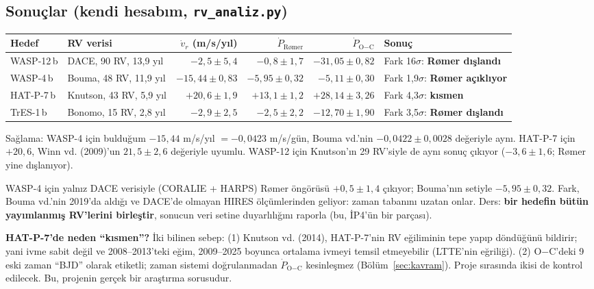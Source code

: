 \subsection{Sonuçlar (kendi hesabım, \texttt{rv\_analiz.py})}
\begin{center}
\small
\begin{tabularx}{\textwidth}{l >{\raggedright\arraybackslash}X r r r >{\raggedright\arraybackslash}X}
\toprule
Hedef & RV verisi & $\dot v_r$ (m/s/yıl) & $\dot P_\text{Rømer}$ & $\dot P_\text{O$-$C}$ & Sonuç\\
\midrule
WASP-12\,b & DACE, 90 RV, 13,9 yıl & $-2{,}5\pm5{,}4$ & $-0{,}8\pm1{,}7$ & $-31{,}05\pm0{,}82$ & Fark 16$\sigma$: \textbf{Rømer dışlandı}\\
WASP-4\,b  & Bouma, 48 RV, 11,9 yıl & $-15{,}44\pm0{,}83$ & $-5{,}95\pm0{,}32$ & $-5{,}11\pm0{,}30$ & Fark 1,9$\sigma$: \textbf{Rømer açıklıyor}\\
HAT-P-7\,b & Knutson, 43 RV, 5,9 yıl & $+20{,}6\pm1{,}9$ & $+13{,}1\pm1{,}2$ & $+28{,}14\pm3{,}26$ & Fark 4,3$\sigma$: \textbf{kısmen}\\
TrES-1\,b  & Bonomo, 15 RV, 2,8 yıl & $-2{,}9\pm2{,}5$ & $-2{,}5\pm2{,}2$ & $-12{,}70\pm1{,}90$ & Fark 3,5$\sigma$: \textbf{Rømer dışlandı}\\
\bottomrule
\end{tabularx}
\end{center}
Sağlama: WASP-4 için bulduğum $-15{,}44$ m/s/yıl $= -0{,}0423$ m/s/gün, Bouma vd.'nin $-0{,}0422\pm0{,}0028$ değeriyle
aynı. HAT-P-7 için $+20{,}6$, Winn vd. (2009)'un $21{,}5\pm2{,}6$ değeriyle uyumlu. WASP-12 için Knutson'ın 29 RV'siyle de
aynı sonuç çıkıyor ($-3{,}6\pm1{,}6$; Rømer yine dışlanıyor).

\begin{dikkat}
WASP-4 için yalnız DACE verisiyle (CORALIE + HARPS) Rømer öngörüsü $+0{,}5\pm1{,}4$ çıkıyor; Bouma'nın setiyle
$-5{,}95\pm0{,}32$. Fark, Bouma vd.'nin 2019'da aldığı ve DACE'de olmayan HIRES ölçümlerinden geliyor: zaman tabanını
uzatan onlar. Ders: \textbf{bir hedefin bütün yayımlanmış RV'lerini birleştir}, sonucun veri setine duyarlılığını raporla
(bu, İP4'ün bir parçası).
\end{dikkat}

\textbf{HAT-P-7'de neden “kısmen”?} İki bilinen sebep: (1) Knutson vd. (2014), HAT-P-7'nin RV eğiliminin tepe yapıp
döndüğünü bildirir; yani ivme sabit değil ve 2008–2013'teki eğim, 2009–2025 boyunca ortalama ivmeyi temsil etmeyebilir
(LTTE'nin eğriliği). (2) O$-$C'deki 9 eski zaman “BJD” olarak etiketli; zaman sistemi doğrulanmadan $\dot P_\text{O$-$C}$
kesinleşmez (Bölüm~\ref{sec:kavram}). Proje sırasında ikisi de kontrol edilecek. Bu, projenin gerçek bir araştırma sorusudur.

